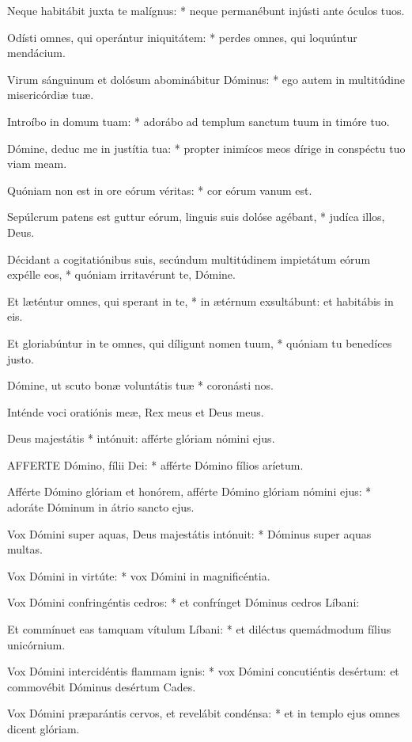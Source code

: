 Neque habitábit juxta te malígnus: * neque permanébunt injústi ante óculos tuos.

Odísti omnes, qui operántur iniquitátem: * perdes omnes, qui loquúntur mendácium.

Virum sánguinum et dolósum abominábitur Dóminus: * ego autem in multitúdine misericórdiæ tuæ.

Introíbo in domum tuam: * adorábo ad templum sanctum tuum in timóre tuo.

Dómine, deduc me in justítia tua: * propter inimícos meos dírige in conspéctu tuo viam meam.

Quóniam non est in ore eórum véritas: * cor eórum vanum est.

Sepúlcrum patens est guttur eórum, linguis suis dolóse agébant, * judíca illos, Deus.

Décidant a cogitatiónibus suis, secúndum multitúdinem impietátum eórum expélle eos, * quóniam irritavérunt te, Dómine.

Et læténtur omnes, qui sperant in te, * in ætérnum exsultábunt: et habitábis in eis.

Et gloriabúntur in te omnes, qui díligunt nomen tuum, * quóniam tu benedíces justo.

Dómine, ut scuto bonæ voluntátis tuæ * coronásti nos.

 Inténde voci oratiónis meæ, Rex meus et Deus meus.

 Deus majestátis * intónuit: afférte glóriam nómini ejus.


\lettrine[lines=2]{A}{FFERTE} Dómino, fílii Dei: * afférte Dómino fílios aríetum.

Afférte Dómino glóriam et honórem, afférte Dómino glóriam nómini ejus: * adoráte Dóminum in átrio sancto ejus.

Vox Dómini super aquas, Deus majestátis intónuit: * Dóminus super aquas multas.

Vox Dómini in virtúte: * vox Dómini in magnificéntia.

Vox Dómini confringéntis cedros: * et confrínget Dóminus cedros Líbani:

Et commínuet eas tamquam vítulum Líbani: * et diléctus quemádmodum fílius unicórnium.

Vox Dómini intercidéntis flammam ignis: * vox Dómini concutiéntis desértum: et commovébit Dóminus desértum Cades.

Vox Dómini præparántis cervos, et revelábit condénsa: * et in templo ejus omnes dicent glóriam.

